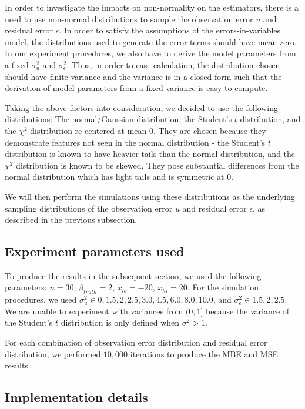 \documentclass{article}
\begin{document}
In order to investigate the impacts on non-normality on the estimators, there is a need to use non-normal distributions to sample the observation error $u$ and residual error $\epsilon$.
In order to satisfy the assumptions of the errors-in-variables model, the distributions used to generate the error terms should have mean zero.
In our experiment procedures, we also have to derive the model parameters from a fixed $\sigma_u^2$ and $\sigma_\epsilon^2$.
Thus, in order to ease calculation, the distribution chosen should have finite variance and the variance is in a closed form such that the derivation of model parameters from a fixed variance is easy to compute.

Taking the above factors into consideration, we decided to use the following distributions: The normal/Gaussian distribution, the Student's $t$ distribution, and the $\chi^2$ distribution re-centered at mean $0$.
They are chosen because they demonstrate features not seen in the normal distribution - the Student's $t$ distribution is known to have heavier tails than the normal distribution, and the $\chi^2$ distribution is known to be skewed.
They pose substantial differences from the normal distribution which has light tails and is symmetric at $0$.

We will then perform the simulations using these distributions as the underlying sampling distributions of the observation error $u$ and residual error $\epsilon$, as described in the previous subsection.

\subsection{Experiment parameters used}

To produce the results in the subsequent section, we used the following parameters: $n=30$, $\beta_{truth}=2$, $x_{lo} = -20$, $x_{hi} = 20$.
For the simulation procedures, we used $\sigma^2_u \in {0, 1.5, 2, 2.5, 3.0, 4.5, 6.0, 8.0, 10.0}$, and $\sigma_\epsilon^2 \in {1.5, 2, 2.5}$.
We are unable to experiment with variances from $(0, 1]$ because the variance of the Student's $t$ distribution is only defined when $\sigma^2 > 1$.

For each combination of observation error distribution and residual error distribution, we performed $10,000$ iterations to produce the MBE and MSE results.

\subsection{Implementation details}
\end{document}

